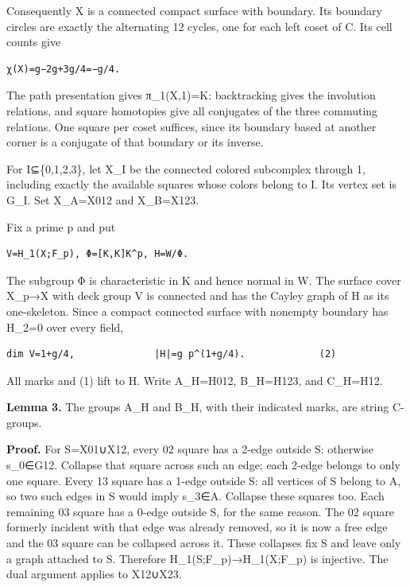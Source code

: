 \documentclass[
  11pt,
  a4paper,
]{article}
\begin{document}
Consequently X is a connected compact surface with boundary. Its
boundary circles are exactly the alternating 12 cycles, one for each
left coset of C. Its cell counts give

\begin{verbatim}
χ(X)=g−2g+3g/4=−g/4.
\end{verbatim}

The path presentation gives π\_1(X,1)=K: backtracking gives the
involution relations, and square homotopies give all conjugates of the
three commuting relations. One square per coset suffices, since its
boundary based at another corner is a conjugate of that boundary or its
inverse.

For I⊆\{0,1,2,3\}, let X\_I be the connected colored subcomplex through
1, including exactly the available squares whose colors belong to I. Its
vertex set is G\_I. Set X\_A=X012 and X\_B=X123.

Fix a prime p and put

\begin{verbatim}
V=H_1(X;F_p), Φ=[K,K]K^p, H=W/Φ.
\end{verbatim}

The subgroup Φ is characteristic in K and hence normal in W. The surface
cover X\_p→X with deck group V is connected and has the Cayley graph of
H as its one-skeleton. Since a compact connected surface with nonempty
boundary has H\_2=0 over every field,

\begin{verbatim}
dim V=1+g/4,              |H|=g p^(1+g/4).             (2)
\end{verbatim}

All marks and (1) lift to H. Write A\_H=H012, B\_H=H123, and C\_H=H12.

\textbf{Lemma 3.} The groups A\_H and B\_H, with their indicated marks,
are string C-groups.

\textbf{Proof.} For S=X01∪X12, every 02 square has a 2-edge outside S:
otherwise s\_0∈G12. Collapse that square across such an edge; each
2-edge belongs to only one square. Every 13 square has a 1-edge outside
S: all vertices of S belong to A, so two such edges in S would imply
s\_3∈A. Collapse these squares too. Each remaining 03 square has a
0-edge outside S, for the same reason. The 02 square formerly incident
with that edge was already removed, so it is now a free edge and the 03
square can be collapsed across it. These collapses fix S and leave only
a graph attached to S. Therefore H\_1(S;F\_p)→H\_1(X;F\_p) is injective.
The dual argument applies to X12∪X23.
\end{document}
